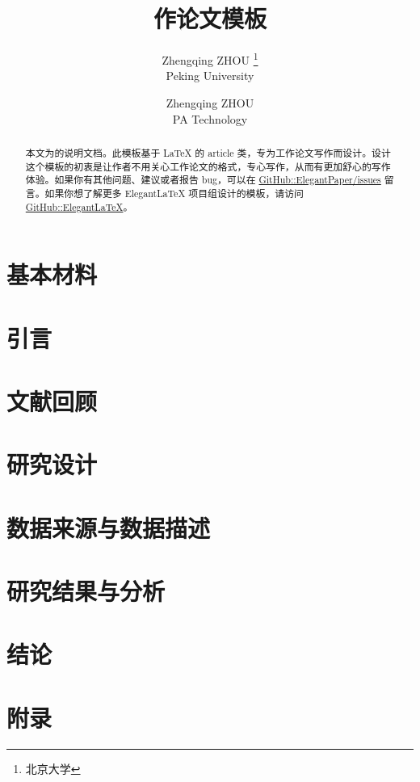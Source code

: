 \documentclass[lang=cn,a4paper]{elegantpaper}
\title{作论文模板}
\author{Zhengqing ZHOU \thanks{北京大学} \\ Peking University \and Zhengqing ZHOU \\ PA Technology}
\institute{\href{https://pe.pku.edu.cn/}{体育教研部}}
\date{\zhtoday}
\begin{document}
\begin{titlepage}
\clearpage\maketitle
\thispagestyle{empty}

\begin{abstract}
本文为的说明文档。此模板基于 \LaTeX{} 的 article 类，专为工作论文写作而设计。设计这个模板的初衷是让作者不用关心工作论文的格式，专心写作，从而有更加舒心的写作体验。如果你有其他问题、建议或者报告 bug，可以在 \href{https://github.com/ElegantLaTeX/ElegantPaper/issues}{GitHub::ElegantPaper/issues} 留言。如果你想了解更多 Elegant\LaTeX{} 项目组设计的模板，请访问 \href{https://github.com/ElegantLaTeX/}{GitHub::ElegantLaTeX}。
\end{abstract}

\end{titlepage}
    \thispagestyle{empty}
	\newpage
    \tableofcontents
    \setcounter{page}{1}
	\newpage

	\section{基本材料} \label{sec:text}
	
	\section{引言} \label{sec:introduction}
	
	\section{文献回顾} \label{sec:review}
	
	\section{研究设计} \label{sec:design}
	
    \section{数据来源与数据描述}\label{sec:data}
	
    \section{研究结果与分析}\label{sec:results}
	
	\section{结论} \label{sec:conclusion}
	
	\newpage
%	
%	
	\nocite{*}
	\printbibliography[heading=bibintoc, title=\ebibname]
	\newpage
	\appendix
	\section{附录} \label{sec:appendix}
	
	\addappheadtotoc
\end{document}
